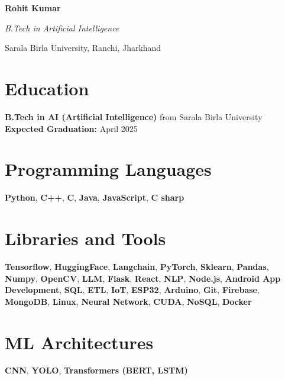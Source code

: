 \documentclass{article}
\begin{document}
\begin{center}
    \textbf{\LARGE Rohit Kumar}
    
    \textit{B.Tech in Artificial Intelligence}
    
    Sarala Birla University, Ranchi, Jharkhand
\end{center}

\section*{Education}
\textbf{B.Tech in AI (Artificial Intelligence)} from Sarala Birla University \\
\textbf{Expected Graduation:} April 2025

\section*{Programming Languages}
\textcolor{myblue}{\textbf{Python}}, \textcolor{myblue}{\textbf{C++}}, \textcolor{myblue}{\textbf{C}}, \textcolor{myblue}{\textbf{Java}}, \textcolor{myblue}{\textbf{JavaScript}}, \textcolor{myblue}{\textbf{C sharp}}

\section*{Libraries and Tools}
\textcolor{myblue}{\textbf{Tensorflow}}, \textcolor{myblue}{\textbf{HuggingFace}}, \textcolor{myblue}{\textbf{Langchain}}, \textcolor{myblue}{\textbf{PyTorch}}, \textcolor{myblue}{\textbf{Sklearn}}, \textcolor{myblue}{\textbf{Pandas}}, \textcolor{myblue}{\textbf{Numpy}}, \textcolor{myblue}{\textbf{OpenCV}}, \textcolor{myblue}{\textbf{LLM}}, \textcolor{myblue}{\textbf{Flask}}, \textcolor{myblue}{\textbf{React}}, \textcolor{myblue}{\textbf{NLP}}, \textcolor{myblue}{\textbf{Node.js}}, \textcolor{myblue}{\textbf{Android App Development}}, \textcolor{myblue}{\textbf{SQL}}, \textcolor{myblue}{\textbf{ETL}}, \textcolor{myblue}{\textbf{IoT}}, \textcolor{myblue}{\textbf{ESP32}}, \textcolor{myblue}{\textbf{Arduino}}, \textcolor{myblue}{\textbf{Git}}, \textcolor{myblue}{\textbf{Firebase}}, \textcolor{myblue}{\textbf{MongoDB}}, \textcolor{myblue}{\textbf{Linux}}, \textcolor{myblue}{\textbf{Neural Network}}, \textcolor{myblue}{\textbf{CUDA}}, \textcolor{myblue}{\textbf{NoSQL}}, \textcolor{myblue}{\textbf{Docker}}

\section*{ML Architectures}
\textcolor{myblue}{\textbf{CNN}}, \textcolor{myblue}{\textbf{YOLO}}, \textcolor{myblue}{\textbf{Transformers (BERT, LSTM)}}
\end{document}
